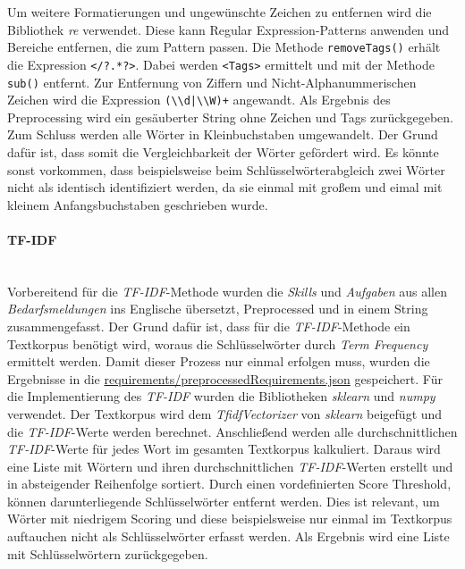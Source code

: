 Um weitere Formatierungen und ungewünschte Zeichen zu entfernen wird die Bibliothek \emph{re} verwendet. Diese kann Regular Expression-Patterns anwenden und Bereiche entfernen, die zum Pattern passen.
%	
Die Methode \lstinline{removeTags()} erhält die Expression \lstinline{</?.*?>}. Dabei werden \lstinline{<Tags>} ermittelt und mit der Methode \lstinline{sub()} entfernt. Zur Entfernung von Ziffern und Nicht-Alphanummerischen Zeichen wird die Expression \lstinline{(\\d|\\W)+} angewandt. Als Ergebnis des Preprocessing wird ein gesäuberter String ohne Zeichen und Tags zurückgegeben. Zum Schluss werden alle Wörter in Kleinbuchstaben umgewandelt. Der Grund dafür ist, dass somit die Vergleichbarkeit der Wörter gefördert wird. Es könnte sonst vorkommen, dass beispielsweise beim Schlüsselwörterabgleich zwei Wörter nicht als identisch identifiziert werden, da sie einmal mit großem und eimal mit kleinem Anfangsbuchstaben geschrieben wurde.
\paragraph{TF-IDF}\label{tfidf}\mbox{}\\
Vorbereitend für die \emph{TF-IDF}-Methode wurden die \emph{Skills} und \emph{Aufgaben} aus allen \emph{Bedarfsmeldungen} ins Englische übersetzt, Preprocessed und in einem String zusammengefasst. Der Grund dafür ist, dass für die \emph{TF-IDF}-Methode ein Textkorpus benötigt wird, woraus die Schlüsselwörter durch \emph{Term Frequency} ermittelt werden. Damit dieser Prozess nur einmal erfolgen muss, wurden die Ergebnisse in die \url{requirements/preprocessedRequirements.json} gespeichert. Für die Implementierung des \emph{TF-IDF} wurden die Bibliotheken \emph{sklearn} und \emph{numpy} verwendet. Der Textkorpus wird dem \emph{TfidfVectorizer} von \emph{sklearn} beigefügt und die \emph{TF-IDF}-Werte werden berechnet. Anschließend werden alle durchschnittlichen \emph{TF-IDF}-Werte für jedes Wort im gesamten Textkorpus kalkuliert. Daraus wird eine Liste mit Wörtern und ihren durchschnittlichen \emph{TF-IDF}-Werten erstellt und in absteigender Reihenfolge sortiert. Durch einen vordefinierten Score Threshold, können darunterliegende Schlüsselwörter entfernt werden. Dies ist relevant, um Wörter mit niedrigem Scoring und diese beispielsweise nur einmal im Textkorpus auftauchen nicht als Schlüsselwörter erfasst werden. Als Ergebnis wird eine Liste mit Schlüsselwörtern zurückgegeben.

